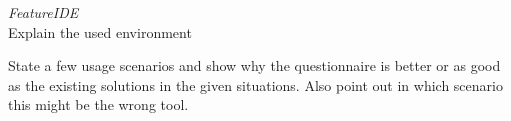 \textit{FeatureIDE}\\
Explain the used environment

State a few usage scenarios and show why the questionnaire is better or as good as the existing solutions in the given situations. Also point out in which scenario this might be the wrong tool.